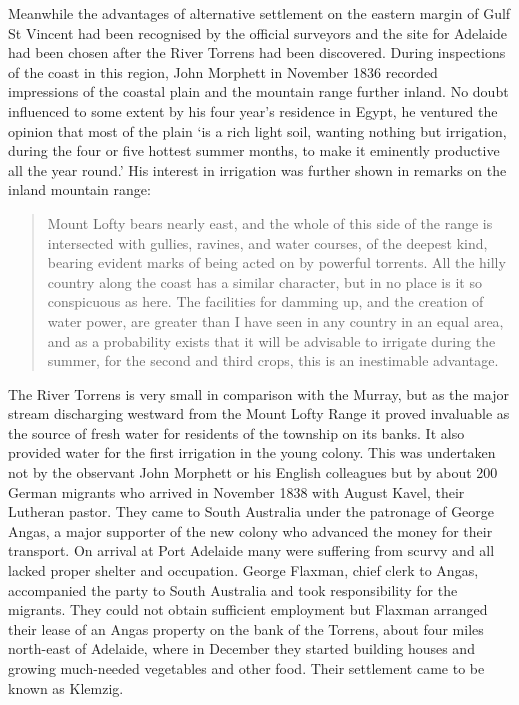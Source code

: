 Meanwhile the advantages of alternative settlement on the eastern
margin of Gulf St Vincent  had been recognised
by the official surveyors and the site for Adelaide
 had
been chosen after the River Torrens  had been
discovered.  During inspections of the coast in this region, John
Morphett  in November 1836 recorded impressions of
the coastal plain and the mountain range further inland.  No doubt
influenced to some extent by his four year's residence in Egypt, he
ventured the opinion that most of the plain `is a rich light soil,
wanting nothing but irrigation, during the four or five hottest summer
months, to make it eminently productive all the year round.'  His
interest in irrigation was further shown in remarks on the inland
mountain range:
\begin{quote}
	Mount Lofty bears nearly east, and the whole of this side of
	the range is intersected with gullies, ravines, and water
	courses, of the deepest kind, bearing evident marks of being
	acted on by powerful torrents.  All the hilly country along
	the coast has a similar character, but in no place is it so
	conspicuous as here.  The facilities for damming up, and the
	creation of water power, are greater than I have seen in any
	country in an equal area, and as a probability exists that it
	will be advisable to irrigate during the summer, for the
	second and third crops, this is an inestimable
	advantage.
\end{quote}

The River Torrens is very small in comparison with the Murray, but as
the major stream discharging westward from the Mount Lofty
 Range it
proved invaluable as the source of fresh water for residents of the
township on its banks.  It also provided water for the first
irrigation in the young colony.  This was undertaken not by the
observant John Morphett or his English colleagues but by about 200
German migrants who arrived in November 1838 with August Kavel,
 their
Lutheran pastor.  They came to South Australia under the patronage of
George Angas,  a major supporter of the new colony
who advanced the money for their transport. On arrival at Port
Adelaide many were suffering from scurvy and all lacked proper shelter
and occupation. George Flaxman,  chief clerk to
Angas, accompanied the party to South Australia and took
responsibility for the migrants.  They could not obtain sufficient
employment but Flaxman arranged their lease of an Angas property on
the bank of the Torrens, about four miles north-east of Adelaide,
where in December they started building houses and growing much-needed
vegetables and other food.  Their settlement came to be known as
Klemzig. 

